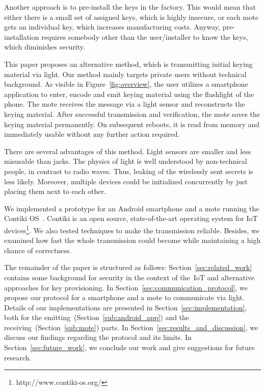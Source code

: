 \documentclass{sig-alternate} %
\begin{document}
Another approach is to pre-install the keys in the factory.
This would mean that either there is a small set of assigned keys, which is highly insecure, or each mote gets an individual key, which increases manufacturing costs.
Anyway, pre-installation requires somebody other than the user/installer to know the keys, which diminishes security.

This paper proposes an alternative method, which is transmitting initial keying material via light.
Our method mainly targets private users without technical background.
As visible in Figure~\ref{fig:overview}, the user utilizes a smartphone application to enter, encode and emit keying material using the flashlight of the phone.
The mote receives the message via a light sensor and reconstructs the keying material.
After successful transmission and verification, the mote saves the keying material permanently.
On subsequent reboots, it is read from memory and immediately usable without any further action required.

There are several advantages of this method.
Light sensors are smaller and less misusable than jacks.
The physics of light is well understood by non-technical people, in contrast to radio waves.
Thus, leaking of the wirelessly sent secrets is less likely.
Moreover, multiple devices could be initialized concurrently by just placing them next to each other.

We implemented a prototype for an Android smartphone and a mote running the Contiki OS~\cite{dunkels04contiki}.
Contiki is an open source, state-of-the-art operating system for IoT devices\footnote{http://www.contiki-os.org/}.
We also tested techniques to make the transmission reliable.
Besides, we examined how fast the whole transmission could become while maintaining a high chance of correctness.

The remainder of the paper is structured as follows:
Section~\ref{sec:related_work} contains some background for security in the context of the~IoT and alternative approaches for key provisioning.
In Section~\ref{sec:communication_protocol}, we propose our protocol for a smartphone and a mote to communicate via light.
Details of our implementations are presented in Section~\ref{sec:implementation}, both for the emitting~(Section~\ref{sub:android_app}) and the receiving~(Section~\ref{sub:mote}) parts.
In Section~\ref{sec:results_and_discussion}, we discuss our findings regarding the protocol and its limits.
In Section~\ref{sec:future_work}, we conclude our work and give suggestions for future research.
\end{document}
